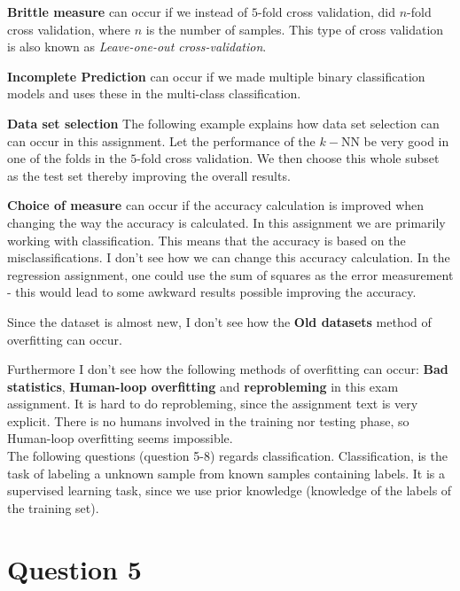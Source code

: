 \documentclass[10pt]{article}
\begin{document}
\textbf{Brittle measure} can occur if we instead of $5$-fold cross validation, did $n$-fold cross validation, where $n$ is the number of samples. This type of cross validation is also known as \emph{Leave-one-out cross-validation}.

\textbf{Incomplete Prediction} can occur if we made multiple binary classification models and uses these in the multi-class classification.

\textbf{Data set selection} The following example explains how data set selection can can occur in this assignment. Let the performance of the $k-$NN be very good in one of the folds in the $5$-fold cross validation. We then choose this whole subset as the test set thereby improving the overall results.                                                                                                                                              

\textbf{Choice of measure} can occur if the accuracy calculation is improved when changing the way the accuracy is calculated. In this assignment we are primarily working with classification. This means that the accuracy is based on the misclassifications. I don't see how we can change this accuracy calculation. In the regression assignment, one could use the sum of squares as the error measurement - this would lead to some awkward results possible improving the accuracy.

Since the dataset is almost new\cite{dataURL}, I don't see how the \textbf{Old datasets} method of overfitting can occur. 

Furthermore I don't see how the following methods of overfitting can occur: \textbf{Bad statistics}, \textbf{Human-loop overfitting} and \textbf{reprobleming} in this exam assignment. It is hard to do reprobleming, since the assignment text is very explicit. There is no humans involved in the training nor testing phase, so Human-loop overfitting seems impossible. \\



                      
The following questions (question 5-8) regards classification. Classification, is the task of labeling a unknown sample from known samples containing labels. It is a supervised learning task, since we use prior knowledge (knowledge of the labels of the training set).


\section*{Question 5} %
\label{sec:question_5}
\end{document}
